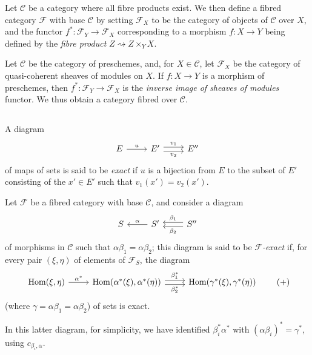 \documentclass{article}
\theoremstyle{plain}
\theoremstyle{definition}
\newenvironment{definition}[1]
  {\renewcommand\theinnercustomdefinition{#1}\innercustomdefinition}
  {\endinnercustomdefinition}
\newenvironment{example}[1]
  {\renewcommand\theinnercustomexample{#1}\innercustomexample}
  {\endinnercustomexample}
\newcommand{\sh}[1]{{\mathscr{#1}}}
\newcommand{\cat}[1]{{\mathcal{#1}}}
\DeclareMathOperator{\Hom}{Hom}
\newcommand{\oldpage}[1]{\marginpar{\footnotesize$\Big\vert$ \textit{p.~#1}}}
\begin{document}
\begin{example}{1}
\label{example:A.1.1(1)}
  Let $\cat{C}$ be a category where all fibre products exist.
  We then define a fibred category $\sh{F}$ with base $\cat{C}$ by setting $\sh{F}_X$ to be the category of objects of $\cat{C}$ over $X$, and the functor $f^*\colon\sh{F}_Y\to\sh{F}_X$ corresponding to a morphism $f\colon X\to Y$ being defined by the \emph{fibre product} $Z\rightsquigarrow Z\times_Y X$.
\end{example}

\begin{example}{2}
\label{example:A.1.1(2)}
  Let $\cat{C}$ be the category of preschemes, and, for $X\in\cat{C}$, let $\sh{F}_X$ be the category of quasi-coherent sheaves of modules on $X$.
  If $f\colon X\to Y$ is a morphism of preschemes, then $f^*\colon\sh{F}_Y\to\sh{F}_X$ is the
\oldpage{190-03}
  \emph{inverse image of sheaves of modules} functor.
  We thus obtain a category fibred over $\cat{C}$.
\end{example}


\subsection{}
\label{A.1.b}

\begin{definition}{1.2}
\label{definition:A.1.2}
  A diagram
  \[
    \begin{tikzcd}
      E \rar["u"]
      & E' \rar[shift left=1,"v_1"] \rar[shift right=1,swap,"v_2"]
      & E''
    \end{tikzcd}
  \]
  of maps of sets is said to be \emph{exact} if $u$ is a bijection from $E$ to the subset of $E'$ consisting of the $x'\in E'$ such that $v_1(x')=v_2(x')$.
\end{definition}

\begin{definition}{1.3}
\label{definition:A.1.3}
  Let $\sh{F}$ be a fibred category with base $\cat{C}$, and consider a diagram
  \[
    \begin{tikzcd}
      S
      & S' \lar[swap,"\alpha"]
      & S'' \lar[shift right=1,swap,"\beta_1"] \lar[shift left=1,"\beta_2"]
    \end{tikzcd}
  \]
  of morphisms in $\cat{C}$ such that $\alpha\beta_1=\alpha\beta_2$;
  this diagram is said to be \emph{$\sh{F}$-exact} if, for every pair $(\xi,\eta)$ of elements of $\sh{F}_S$, the diagram
  \[
  \label{equation-definition:A.1.3}
    \begin{tikzcd}
      \Hom(\xi,\eta) \rar["\alpha^*"]
      & \Hom(\alpha^*(\xi),\alpha^*(\eta)) \rar[shift left=1,"\beta_1^*"] \rar[shift right=1,swap,"\beta_2^*"]
      & \Hom(\gamma^*(\xi),\gamma^*(\eta))
    \end{tikzcd}
  \tag{+}
  \]
  (where $\gamma=\alpha\beta_1=\alpha\beta_2$) of sets is exact.

  In this latter diagram, for simplicity, we have identified $\beta_i^*\alpha^*$ with $(\alpha\beta_i)^*=\gamma^*$, using $c_{\beta_i,\alpha}$.
\end{definition}
\end{document}
